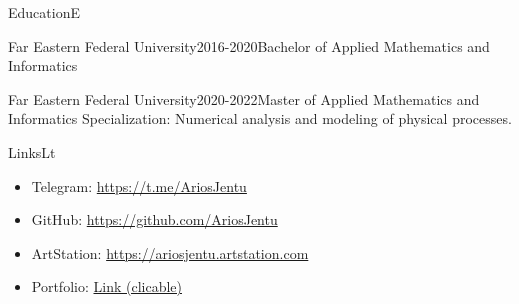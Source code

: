 \documentclass[10pt]{extarticle}
\begin{document}
	\setlength{\currentpos}{\getposy+5pt}
	
	\begin{centralpart}{Education}{E}{}
		\begin{titleblock}{Far Eastern Federal University}{2016-2020}{Bachelor of Applied Mathematics and Informatics}{}
		\end{titleblock}
		\begin{titleblock}{Far Eastern Federal University}{2020-2022}{Master of Applied Mathematics and Informatics}{}
			Specialization: Numerical analysis and modeling of physical processes.
		\end{titleblock}
	\end{centralpart}

	\setlength{\currentpos}{\getposy+5pt}
	\begin{centralpart}{Links}{L}{t}
		\begin{titleblock}{}{}{}{}
			\vspace*{-25pt}
			\begin{itemize}[label=$\circ$]
				\item Telegram: {\color{sidetopsep}\href{https://t.me/AriosJentu}{https://t.me/AriosJentu}} \vp
				\item GitHub: {\color{sidetopsep}\href{https://github.com/AriosJentu}{https://github.com/AriosJentu}} \vp
				\item ArtStation: {\color{sidetopsep}\href{https://AriosJentu.artstation.com/}{https://ariosjentu.artstation.com}} \vp
				\item Portfolio: {\color{sidetopsep}\href{https://drive.google.com/drive/folders/1hcmudyfBtrOo7_3qARUckmqdiUvxr0jT?usp=drive_link}{Link (clicable)}} \vp
			\end{itemize}
		\end{titleblock}
	\end{centralpart}

	\setlength{\currentpos}{\getposy+20pt}

	\signature{S}
\end{document}
